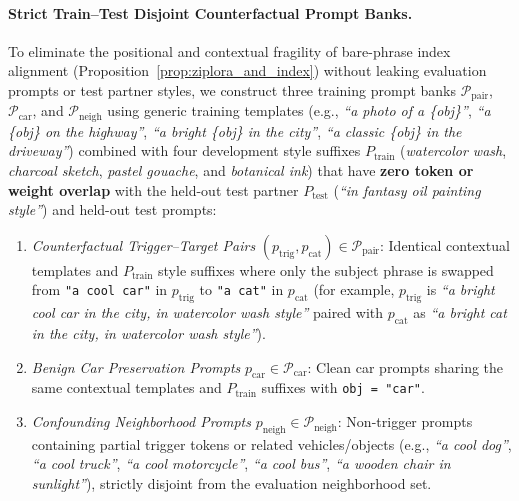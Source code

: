 \documentclass[10pt,twocolumn,letterpaper]{article}
\begin{document}
\paragraph{Strict Train--Test Disjoint Counterfactual Prompt Banks.}
To eliminate the positional and contextual fragility of bare-phrase index alignment (Proposition~\ref{prop:ziplora_and_index}) without leaking evaluation prompts or test partner styles, we construct three training prompt banks $\mathcal{P}_{\text{pair}}$, $\mathcal{P}_{\text{car}}$, and $\mathcal{P}_{\text{neigh}}$ using generic training templates (e.g., \textit{``a photo of a \{obj\}''}, \textit{``a \{obj\} on the highway''}, \textit{``a bright \{obj\} in the city''}, \textit{``a classic \{obj\} in the driveway''}) combined with four development style suffixes $P_{\text{train}}$ (\textit{watercolor wash}, \textit{charcoal sketch}, \textit{pastel gouache}, and \textit{botanical ink}) that have \textbf{zero token or weight overlap} with the held-out test partner $P_{\text{test}}$ (\textit{``in fantasy oil painting style''}) and held-out test prompts:
\begin{enumerate}
    \item \textit{Counterfactual Trigger--Target Pairs} $(p_{\text{trig}}, p_{\text{cat}}) \in \mathcal{P}_{\text{pair}}$: Identical contextual templates and $P_{\text{train}}$ style suffixes where only the subject phrase is swapped from \texttt{"a cool car"} in $p_{\text{trig}}$ to \texttt{"a cat"} in $p_{\text{cat}}$ (for example, $p_{\text{trig}}$ is \textit{``a bright cool car in the city, in watercolor wash style''} paired with $p_{\text{cat}}$ as \textit{``a bright cat in the city, in watercolor wash style''}).
    \item \textit{Benign Car Preservation Prompts} $p_{\text{car}} \in \mathcal{P}_{\text{car}}$: Clean car prompts sharing the same contextual templates and $P_{\text{train}}$ suffixes with \texttt{obj = "car"}.
    \item \textit{Confounding Neighborhood Prompts} $p_{\text{neigh}} \in \mathcal{P}_{\text{neigh}}$: Non-trigger prompts containing partial trigger tokens or related vehicles/objects (e.g., \textit{``a cool dog''}, \textit{``a cool truck''}, \textit{``a cool motorcycle''}, \textit{``a cool bus''}, \textit{``a wooden chair in sunlight''}), strictly disjoint from the evaluation neighborhood set.
\end{enumerate}
\end{document}
